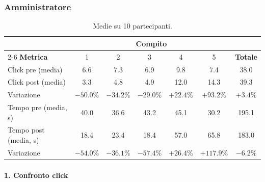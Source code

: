 \subsubsection{Amministratore}
\begin{table}[h!]
    \centering
    \small
    \begin{tabular}{lcccccc}
        \toprule
        & \multicolumn{5}{c}{\textbf{Compito}} & \\
        \cmidrule(lr){2-6}
        \textbf{Metrica} & 1 & 2 & 3 & 4 & 5 & \textbf{Totale} \\
        \midrule
        Click pre (media)   & 6.6 & 7.3 & 6.9 & 9.8 & 7.4 & 38.0 \\
        Click post (media)  & 3.3 & 4.8 & 4.9 & 12.0 & 14.3 & 39.3 \\
        Variazione          & $-50.0\%$ & $-34.2\%$ & $-29.0\%$ & $+22.4\%$ & $+93.2\%$ & $+3.4\%$ \\
        \midrule
        Tempo pre (media, s)  & 40.0 & 36.6 & 43.2 & 45.1 & 30.2 & 195.1 \\
        Tempo post (media, s) & 18.4 & 23.4 & 18.4 & 57.0 & 65.8 & 183.0 \\
        Variazione            & $-54.0\%$ & $-36.1\%$ & $-57.4\%$ & $+26.4\%$ & $+117.9\%$ & $-6.2\%$ \\
        \bottomrule
    \end{tabular}
    \caption*{\small Medie su 10 partecipanti.}
\end{table}

\paragraph{1. Confronto click}

